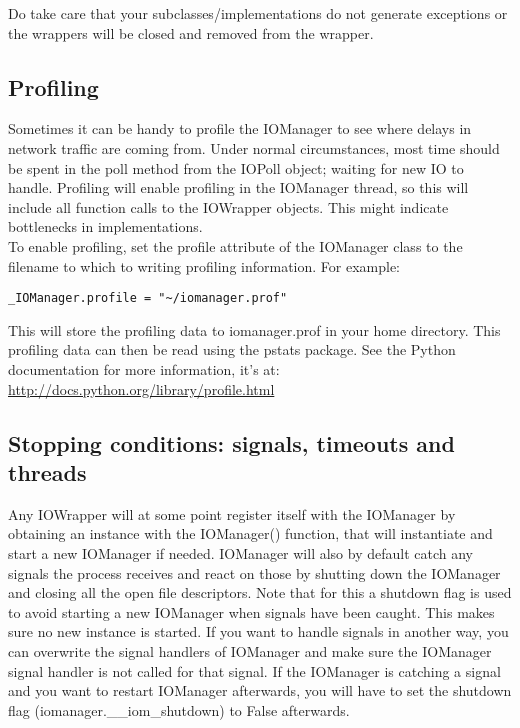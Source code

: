 \documentclass[a4paper, 10pt, oneside]{article}
\begin{document}
Do take care that your subclasses/implementations do not generate exceptions or
the wrappers will be closed and removed from the wrapper.

\subsection{Profiling}
Sometimes it can be handy to profile the IOManager to see where delays in
network traffic are coming from. Under normal circumstances, most time should be
spent in the poll method from the IOPoll object; waiting for new IO to handle.
Profiling will enable profiling in the IOManager thread, so this will include
all function calls to the IOWrapper objects. This might indicate bottlenecks in
implementations.\\

To enable profiling, set the profile attribute of the IOManager class to the
filename to which to writing profiling information. For example:\\

\begin{lstlisting}
_IOManager.profile = "~/iomanager.prof"
\end{lstlisting}

This will store the profiling data to iomanager.prof in your home directory.
This profiling data can then be read using the pstats package. See the Python
documentation for more information, it's at:\\

\url{http://docs.python.org/library/profile.html}

\subsection{Stopping conditions: signals, timeouts and threads}
Any IOWrapper will at some point register itself with the IOManager by obtaining
an instance with the IOManager() function, that will instantiate and start a new
IOManager if needed. IOManager will also by default catch any signals the
process receives and react on those by shutting down the IOManager and closing
all the open file descriptors. Note that for this a shutdown flag is used to
avoid starting a new IOManager when signals have been caught. This makes sure no
new instance is started. If you want to handle signals in another way, you can
overwrite the signal handlers of IOManager and make sure the IOManager signal
handler is not called for that signal. If the IOManager is catching a signal and
you want to restart IOManager afterwards, you will have to set the shutdown flag
(iomanager.\_\_iom\_shutdown) to False afterwards.\\
\end{document}
